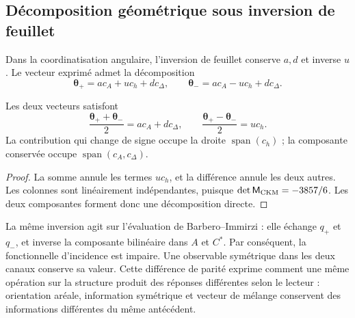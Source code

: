 \subsection{Décomposition géométrique sous inversion de feuillet}
\label{sec:ii09-descomposicion-paridad}

Dans la coordinatisation angulaire, l’inversion de feuillet conserve \(a,d\) et
inverse \(u\). Le vecteur exprimé admet la décomposition
\[
 \boldsymbol\theta_+=a c_A+u c_h+d c_\Delta,
 \qquad
 \boldsymbol\theta_-=a c_A-u c_h+d c_\Delta.
\]
\begin{proposition}
\label{prop:ii09-paridad-angular}
Les deux vecteurs satisfont
\[
 \frac{\boldsymbol\theta_++\boldsymbol\theta_-}{2}
       =a c_A+d c_\Delta,\qquad
 \frac{\boldsymbol\theta_+-\boldsymbol\theta_-}{2}=u c_h.
\]
La contribution qui change de signe occupe la droite
\(\operatorname{span}(c_h)\) ; la composante conservée occupe
\(\operatorname{span}(c_A,c_\Delta)\).
\end{proposition}
\begin{proof}
La somme annule les termes \(u c_h\), et la différence annule
les deux autres. Les colonnes sont linéairement indépendantes, puisque
\(\det\mathsf M_{\rm CKM}=-3857/6\). Les deux
composantes forment donc une décomposition directe.
\end{proof}

La même inversion agit sur l’évaluation de Barbero--Immirzi :
elle échange \(q_+\) et \(q_-\), et inverse la composante bilinéaire
dans \(A\) et \(C^*\). Par conséquent, la fonctionnelle d’incidence
est impaire. Une observable symétrique dans les deux canaux conserve sa
valeur. Cette différence de parité exprime comment une même
opération sur la structure produit des réponses différentes selon
le lecteur : orientation aréale, information symétrique et vecteur de
mélange conservent des informations différentes du même antécédent.
